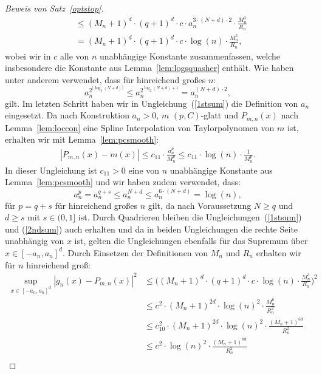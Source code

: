 \begin{proof}[Beweis von Satz~\ref{optstop}]
\begin{equation}
\begin{split}
& \leq (M_n + 1)^d \cdot (q + 1)^d \cdot c\cdot a_n^{3 \cdot (N + d) \cdot 2} \cdot \frac{M_n^3}{R_n} \\
& =  (M_n + 1)^d \cdot (q + 1)^d \cdot c\cdot \log(n) \cdot \frac{M_n^3}{R_n},
\end{split}
\end{equation}
wobei wir in $c$ alle von $n$ unabhängige Konstante zusammenfassen, welche insbesondere die Konstante aus Lemma~\ref{lem:logsquasher} enthält.
Wie haben unter anderem verwendet, dass für hinreichend großes $n$:
$$a_n^{2^{\lceil\log_2(N + d)\rceil}} \leq a_n^{2^{\log_2(N + d) + 1}} = a_n^{(N + d) \cdot 2},$$ gilt. Im letzten Schritt haben wir in Ungleichung~(\ref{1stsum}) die Definition von $a_n$ eingesetzt. 
Da nach Konstruktion $a_n > 0$, $m$ $(p, C)$-glatt und $P_{m,n}(x)$ nach Lemma~\ref{lem:loccon} eine Spline Interpolation von Taylorpolynomen von $m$ ist, erhalten wir mit Lemma~\ref{lem:pcsmooth}:
\begin{equation}
\label{2ndsum}
\begin{split}
|P_{m,n}(x) - m(x)| \leq c_{11} \cdot \frac{a_n^p}{M_n^p} \leq c_{11} \cdot \log(n) \cdot \frac{1}{M_n^p}.
\end{split}
\end{equation}
In dieser Ungleichung ist $c_{11} > 0$ eine von $n$ unabhängige Konstante aus Lemma~\ref{lem:pcsmooth} und wir haben zudem verwendet, dass:
$$a_n^p = a_n^{q + s} \leq a_n^{N + d} \leq a_n^{6 \cdot (N + d)} = \log(n),$$
für $p = q + s$ für hinreichend großes $n$ gilt, da nach Voraussetzung $N \geq q$ und $d \geq s$ mit $s \in (0, 1]$ ist.
Durch Quadrieren bleiben die Ungleichungen~(\ref{1stsum}) und (\ref{2ndsum}) auch erhalten und da in beiden Ungleichungen die rechte Seite unabhängig von $x$ ist, gelten die Ungleichungen ebenfalls für das Supremum über $x \in [-a_n,a_n]^d$. Durch Einsetzen der Definitionen von $M_n$ und $R_n$ erhalten wir für $n$ hinreichend groß:
\begin{equation}
\label{3rdsum}
\begin{split}
\sup_{x \in [-a_n, a_n]^d} |g_n(x) - P_{m,n}(x)|^2 & \leq \bigg((M_n + 1)^d \cdot (q + 1)^d \cdot c \cdot \log(n) \cdot \frac{M_n^3}{R_n}\bigg)^2 \\
& \leq c^2 \cdot (M_n + 1)^{2d} \cdot \log(n)^2 \cdot \frac{M_n^6}{R_n^2} \\
& \leq  c_{10}^2 \cdot (M_n + 1)^{2d} \cdot \log(n)^2 \cdot \frac{(M_n + 1)^{6d}}{R_n^2} \\
& \leq  c^2 \cdot \log(n)^2 \cdot \frac{(M_n + 1)^{8d}}{R_n^2} \\

\end{split}
\end{equation}
\end{proof}
